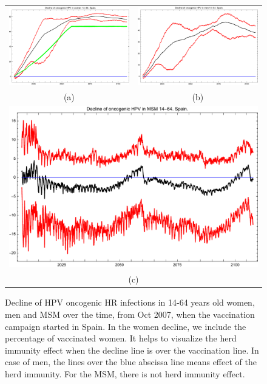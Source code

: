 \begin{figure}[!]
	\centering
	\begin{tabular}{cc}
		\includegraphics[width=0.5\linewidth]{IMGs/4.-Spain/Decl_muj_14_64_onco_ESP.pdf}	& 
		\includegraphics[width=0.5\linewidth]{IMGs/4.-Spain/Decl_hom_14_64_onco_ESP.pdf}  \\ 
		(a)	& (b) \\ 
		\multicolumn{2}{c}{ \includegraphics[width=0.5\linewidth]{IMGs/4.-Spain/Decl_MSM_14_64_onco_ESP.pdf} } \\ 
		\multicolumn{2}{c}{(c)} \\ 
	\end{tabular} 
	\caption{Decline of HPV oncogenic HR infections in 14-64 years old women, men and MSM over the time, from Oct 2007, when the vaccination campaign started in Spain. In the women decline, we include the percentage of vaccinated women. It helps to visualize the herd immunity effect when the decline line is over the vaccination line. In case of men, the lines over the blue abscissa line means effect of the herd immunity. For the MSM, there is not herd immunity effect.}
	\label{fig:oncoESP}
\end{figure}


